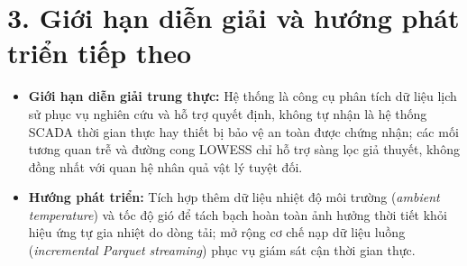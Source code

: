 \documentclass[12pt,a4paper,oneside]{report}
\begin{document}
\section*{3. Giới hạn diễn giải và hướng phát triển tiếp theo}

\begin{itemize}
  \item \textbf{Giới hạn diễn giải trung thực:} Hệ thống là công cụ phân tích dữ liệu lịch sử phục vụ nghiên cứu và hỗ trợ quyết định, không tự nhận là hệ thống SCADA thời gian thực hay thiết bị bảo vệ an toàn được chứng nhận; các mối tương quan trễ và đường cong LOWESS chỉ hỗ trợ sàng lọc giả thuyết, không đồng nhất với quan hệ nhân quả vật lý tuyệt đối.
  \item \textbf{Hướng phát triển:} Tích hợp thêm dữ liệu nhiệt độ môi trường (\textit{ambient temperature}) và tốc độ gió để tách bạch hoàn toàn ảnh hưởng thời tiết khỏi hiệu ứng tự gia nhiệt do dòng tải; mở rộng cơ chế nạp dữ liệu luồng (\textit{incremental Parquet streaming}) phục vụ giám sát cận thời gian thực.
\end{itemize}
\end{document}
